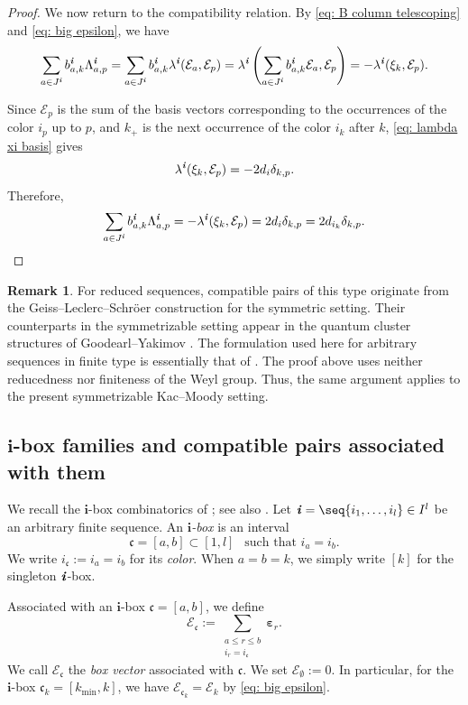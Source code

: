 \documentclass[12pt, leqno]{amsart}
\numberwithin{equation}{section}
\theoremstyle{plain}
\theoremstyle{definition}
\newtheorem{remark}[lemma]{Remark}
\renewcommand{\le}{\leqslant}
\newcommand{\seteq}{\mathbin{:=}}
\newcommand{\ve}{\boldsymbol{\varepsilon}}
\newcommand{\ii}{ \textbf{\textit{i}}}
\newcommand{\frakc}{\mathfrak{c}}
\newcommand{\bfi}{\mathbf{i}}
\newcommand{\calE}{\mathcal{E}}
\begin{document}
\begin{proof}
We now return to the compatibility relation. By
\eqref{eq: B column telescoping} and
\eqref{eq: big epsilon}, we have
\[
\begin{aligned}
\sum_{a\in J^\ii}b^\ii_{a,k}\Lambda^\ii_{a,p} = \sum_{a\in J^\ii} b^\ii_{a,k}\lambda^\ii(\calE_a,\calE_p)
= \lambda^\ii \left( \sum_{a\in J^\ii}b^\ii_{a,k}\calE_a, \calE_p \right)
= -\lambda^\ii(\xi_k,\calE_p).
\end{aligned}
\]

Since $\calE_p$ is the sum of the basis vectors corresponding to
the occurrences of the color $i_p$ up to $p$, and $k_+$ is the next
occurrence of the color $i_k$ after $k$, \eqref{eq: lambda xi basis}
gives
\[
\lambda^\ii(\xi_k,\calE_p) = -2d_i\delta_{k,p}.
\]
Therefore,
\[
\sum_{a\in J^\ii}b^\ii_{a,k}\Lambda^\ii_{a,p} = -\lambda^\ii(\xi_k,\calE_p) = 2d_i\delta_{k,p} = 2d_{i_k}\delta_{k,p}. \qedhere
\]
\end{proof}

\begin{remark}
For reduced sequences, compatible pairs of this type originate from
the Geiss--Leclerc--Schr\"oer construction
\cite{GLS06,GLS08,GLS11} for the symmetric setting.
Their counterparts in the symmetrizable setting appear in the
quantum cluster structures of Goodearl--Yakimov \cite{GY17,GY21}.
The formulation used here for arbitrary sequences in finite type is
essentially that of \cite[Proposition~1.2, Corollary~1.3]{FHOO2}.
The proof above uses neither reducedness nor finiteness of the Weyl
group. Thus, the same argument applies to the present symmetrizable
Kac--Moody setting.
\end{remark}

\subsection{$\bfi$-box families and compatible pairs associated with them}
\label{subsec: ibox compatible pair}


We recall the $\bfi$-box combinatorics of \cite{KK24}; see also
\cite{KKOP24A}. Let $\ii=\seq{i_1,\ldots,i_l}\in I^l$ be an arbitrary finite sequence.
An \emph{$\bfi$-box} is an interval
\[
\frakc=[a,b]\subset[1,l] \ \ \text{ such that $i_a=i_b$}.
\]
We write $i_{\frakc}\seteq i_a=i_b$ for its \emph{color}. When $a=b=k$, we simply write $[k]$ for the singleton
$\ii$-box.

Associated with an $\bfi$-box $\frakc=[a,b]$, we define
\begin{equation}\label{eq: big epsilon box}
\calE_{\frakc} \seteq \sum_{\substack{a\le r\le b\\ i_r=i_{\frakc}}}\ve_r.
\end{equation}
We call $\calE_{\frakc}$ the \emph{box vector} associated with
$\frakc$. We set $\calE_\emptyset \seteq 0$.
In particular, for the $\bfi$-box $\frakc_k=[k_{\min},k]$, we have $\calE_{\frakc_k}=\calE_k$ by \eqref{eq: big epsilon}.
\end{document}
